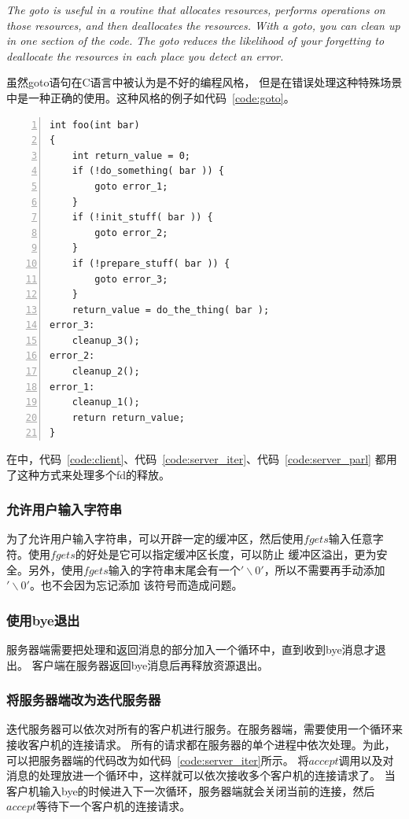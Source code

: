 \documentclass[a4paper,twoside]{article}
\begin{document}
\begin{spacing}{1.2}
\textit{
	The goto is \emph{useful} in a routine that allocates resources, performs operations on those resources, 
	and then deallocates the resources. With a goto, you can clean up in one section of the code. 
	The goto \emph{reduces the likelihood of your forgetting to deallocate the resources in each place you detect an error.}
}

虽然goto语句在C语言中被认为是不好的编程风格\cite{dijkstra1968letters}，
但是在错误处理这种特殊场景中是一种正确的使用。这种风格的例子如代码~\ref{code:goto}。

\begin{lstlisting}[numbers=left,style=CppStyle,caption=向下goto,label={code:goto}]
int foo(int bar)
{
    int return_value = 0;
    if (!do_something( bar )) {
        goto error_1;
    }
    if (!init_stuff( bar )) {
        goto error_2;
    }
    if (!prepare_stuff( bar )) {
        goto error_3;
    }
    return_value = do_the_thing( bar );
error_3:
    cleanup_3();
error_2:
    cleanup_2();
error_1:
    cleanup_1();
    return return_value;
}
\end{lstlisting}

在中，代码~\ref{code:client}、代码~\ref{code:server_iter}、代码~\ref{code:server_parl}
都用了这种方式来处理多个fd的释放。

\subsubsection{允许用户输入字符串}

为了允许用户输入字符串，可以开辟一定的缓冲区，然后使用$fgets$输入任意字符。使用$fgets$的好处是它可以指定缓冲区长度，可以防止
缓冲区溢出，更为安全。另外，使用$fgets$输入的字符串末尾会有一个$'\backslash 0'$，所以不需要再手动添加$'\backslash 0'$。也不会因为忘记添加
该符号而造成问题。

\subsubsection{使用bye退出}

服务器端需要把处理和返回消息的部分加入一个循环中，直到收到bye消息才退出。
客户端在服务器返回bye消息后再释放资源退出。

\subsubsection{将服务器端改为迭代服务器}

迭代服务器可以依次对所有的客户机进行服务。在服务器端，需要使用一个循环来接收客户机的连接请求。
所有的请求都在服务器的单个进程中依次处理。为此，可以把服务器端的代码改为如代码~\ref{code:server_iter}所示。
将$accept$调用以及对消息的处理放进一个循环中，这样就可以依次接收多个客户机的连接请求了。
当客户机输入bye的时候进入下一次循环，服务器端就会关闭当前的连接，然后$accept$等待下一个客户机的连接请求。


\end{spacing}
\end{document}
